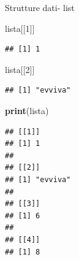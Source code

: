 \documentclass[
  ignorenonframetext,
]{beamer}
\newenvironment{Shaded}{\begin{snugshade}}{\end{snugshade}}
\newcommand{\DecValTok}[1]{\textcolor[rgb]{0.00,0.00,0.81}{#1}}
\newcommand{\FunctionTok}[1]{\textcolor[rgb]{0.13,0.29,0.53}{\textbf{#1}}}
\newcommand{\NormalTok}[1]{#1}
\begin{document}
\begin{frame}[fragile]{Strutture dati- list}
\begin{Shaded}
\begin{Highlighting}[]
\NormalTok{lista[[}\DecValTok{1}\NormalTok{]]}
\end{Highlighting}
\end{Shaded}

\begin{verbatim}
## [1] 1
\end{verbatim}

\begin{Shaded}
\begin{Highlighting}[]
\NormalTok{lista[[}\DecValTok{2}\NormalTok{]]}
\end{Highlighting}
\end{Shaded}

\begin{verbatim}
## [1] "evviva"
\end{verbatim}

\begin{Shaded}
\begin{Highlighting}[]
\FunctionTok{print}\NormalTok{(lista)}
\end{Highlighting}
\end{Shaded}

\begin{verbatim}
## [[1]]
## [1] 1
## 
## [[2]]
## [1] "evviva"
## 
## [[3]]
## [1] 6
## 
## [[4]]
## [1] 8
\end{verbatim}
\end{frame}
\end{document}
